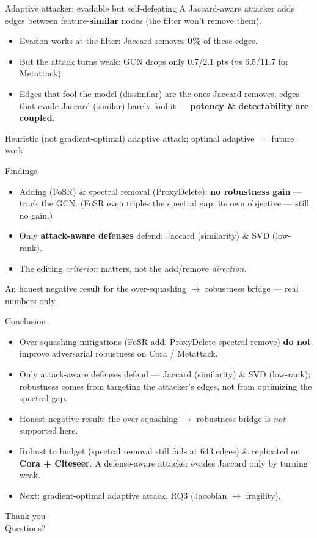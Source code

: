 \documentclass[aspectratio=169]{beamer}
\begin{document}
\begin{frame}{Adaptive attacker: evadable but self-defeating}
  A Jaccard-aware attacker adds edges between feature-\textbf{similar} nodes (the filter won't remove them).
  \begin{itemize}
    \item Evasion works at the filter: Jaccard removes \textbf{0\%} of these edges.
    \item But the attack turns weak: GCN drops only $0.7$/$2.1$ pts (vs $6.5$/$11.7$ for Metattack).
    \item[$\Rightarrow$] Edges that fool the model (dissimilar) are the ones Jaccard removes; edges that
      evade Jaccard (similar) barely fool it --- \textbf{potency \& detectability are coupled}.
  \end{itemize}
  \footnotesize Heuristic (not gradient-optimal) adaptive attack; optimal adaptive $=$ future work.
\end{frame}

\begin{frame}{Findings}
  \begin{itemize}
    \item Adding (FoSR) \& spectral removal (ProxyDelete): \textbf{no robustness gain} --- track the GCN.
      (FoSR even triples the spectral gap, its own objective --- still no gain.)
    \item Only \textbf{attack-aware defenses} defend: Jaccard (similarity) \& SVD (low-rank).
    \item[$\Rightarrow$] The editing \emph{criterion} matters, not the add/remove \emph{direction}.
  \end{itemize}
  \vfill
  \footnotesize An honest negative result for the over-squashing $\to$ robustness bridge --- real numbers only.
\end{frame}

\begin{frame}{Conclusion}
  \begin{itemize}
    \item Over-squashing mitigations (FoSR add, ProxyDelete spectral-remove) \textbf{do not} improve
      adversarial robustness on Cora / Metattack.
    \item Only attack-aware defenses defend --- Jaccard (similarity) \& SVD (low-rank); robustness comes
      from targeting the attacker's edges, not from optimizing the spectral gap.
    \item Honest negative result: the over-squashing $\to$ robustness bridge is \emph{not} supported here.
    \item Robust to budget (spectral removal still fails at 643 edges) \& replicated on
      \textbf{Cora + Citeseer}. A defense-aware attacker evades Jaccard only by turning weak.
    \item Next: gradient-optimal adaptive attack, RQ3 (Jacobian $\to$ fragility).
  \end{itemize}
\end{frame}

\begin{frame}{}
  \centering \Huge Thank you \\[1em] \normalsize Questions?
\end{frame}
\end{document}

